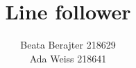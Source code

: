 \documentclass[a4paper,12pt]{article}
\makeatletter
\newcommand{\linia}{\rule{\linewidth}{0.4mm}}
\renewcommand{\maketitle}{\begin{titlepage}  
    \vspace*{1cm}
    \begin{center}
  Roboty mobilne - projekt
    \end{center}
      \vspace{3cm}
    \begin{center}
     \LARGE \textsc {\@title}
         \end{center}
     \vspace{1cm}
    
    \begin{center}
    \textit{ Autorzy:}\\
   \textit{\@author} 
     \end{center}
      \vspace{1cm}
     
     \begin{center}
    Termin zajęć :
    czwartek godz. 7:30
    
    Prowadzący:
  Mateusz Cholewiński %
    \end{center}
    
    \vspace*{\stretch{6}}
    \begin{center}
    \@date
    \end{center}
  \end{titlepage}
}
\makeatother
\begin{document}
\makeatletter
\newcommand{\linia}{\rule{\linewidth}{0.4mm}}
\renewcommand{\maketitle}{\begin{titlepage}  
    \vspace*{1cm}
    \begin{center}
  Roboty mobilne - projekt
    \end{center}
      \vspace{3cm}
    \begin{center}
     \LARGE \textsc {\@title}
         \end{center}
     \vspace{1cm}
    
    \begin{center}
    \textit{ Autorzy:}\\
   \textit{\@author} 
     \end{center}
      \vspace{1cm}
     
     \begin{center}
    Termin zajęć :
    czwartek godz. 7:30
    
    Prowadzący:
  Mateusz Cholewiński %
    \end{center}
    
    \vspace*{\stretch{6}}
    \begin{center}
    \@date
    \end{center}
  \end{titlepage}
}
\makeatother
\author{Beata Berajter 218629\\
Ada Weiss 218641}%
\title{Line follower}
\end{document}
